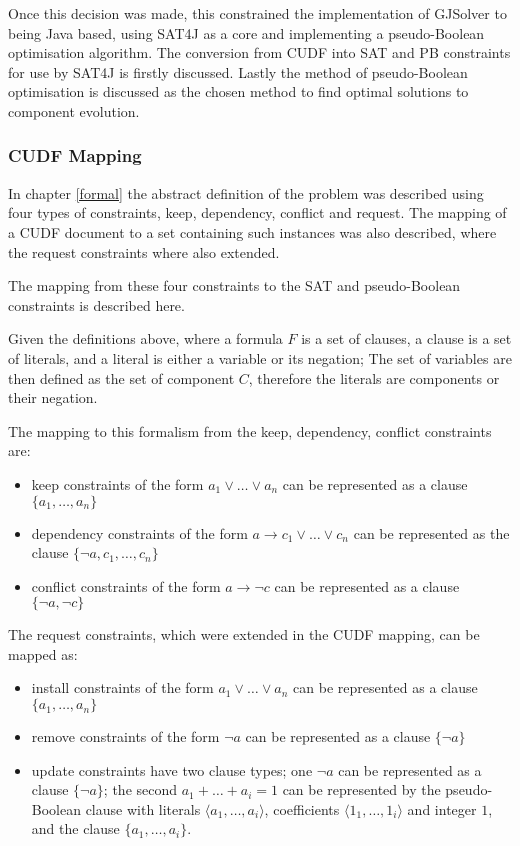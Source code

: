 Once this decision was made, this constrained the implementation of GJSolver to being Java based, 
using SAT4J as a core and implementing a pseudo-Boolean optimisation algorithm.
The conversion from CUDF into SAT and PB constraints for use by SAT4J is firstly discussed.
Lastly the method of pseudo-Boolean optimisation is discussed as the chosen method to find optimal solutions to component evolution.

\subsubsection{CUDF Mapping}
In chapter \ref{formal} the abstract definition of the problem was described using four types of constraints, keep, dependency, conflict and request.
The mapping of a CUDF document to a set containing such instances was also described, where the request constraints where also extended.

The mapping from these four constraints to the SAT and pseudo-Boolean constraints is described here.

Given the definitions above, where a formula $F$ is a set of clauses, a clause is a set of literals, and a literal is either a variable or its negation;
The set of variables are then defined as the set of component $C$, therefore the literals are components or their negation.

The mapping to this formalism from the keep, dependency, conflict constraints are: 
\begin{itemize}
  \item keep constraints of the form $a_1\vee \ldots \vee a_n$  can be represented as a clause $\{a_1,\ldots,a_n\}$
  \item dependency constraints of the form $a \rightarrow c_1 \vee \ldots \vee c_n$ can be represented as the clause $\{\neg a, c_1, \ldots, c_n\}$
  \item conflict constraints of the form $a \rightarrow \neg c$ can be represented as a clause $\{\neg a, \neg c\}$
\end{itemize}

The request constraints, which were extended in the CUDF mapping, can be mapped as:
\begin{itemize}
      \item install constraints of the form $a_1 \vee \ldots \vee a_n$  can be represented as a clause $\{a_1,\ldots,a_n\}$
      \item remove constraints of the form $\neg a$ can be represented as a clause $\{\neg a\}$
      \item update constraints have two clause types; one $\neg a$ can be represented as a clause $\{\neg a\}$;
      the second $a_1 + \ldots + a_i = 1$ can be represented by the pseudo-Boolean clause with literals $\langle a_1,\ldots,a_i\rangle$, coefficients $\langle 1_1,\ldots,1_i \rangle$
      and integer $1$, and the clause $\{a_1,\ldots,a_i\}$.
\end{itemize}

